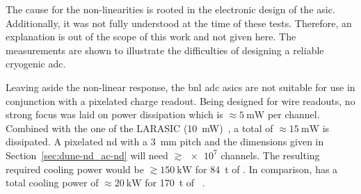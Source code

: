 The cause for the non-linearities is rooted in the electronic design of the \gls{asic}.
Additionally, it was not fully understood at the time of these tests.
Therefore, an explanation is out of the scope of this work and not given here.
The measurements are shown to illustrate the difficulties of designing a reliable cryogenic \gls{adc}.

Leaving aside the non-linear response, the \gls{bnl} \gls{adc} \glspl{asic} are not suitable for use in conjunction with a pixelated \lartpc{} charge readout.
Being designed for wire readouts, no strong focus was laid on power dissipation which is $\approx \SI{5}{\milli\watt}$ per channel.
Combined with the one of the LARASIC (\SI{10}{\milli\watt})~\cite{larasic}, a total of $\approx \SI{15}{\milli\watt}$ is dissipated.
A pixelated \dune{} \gls{nd} with a \SI{3}{\milli\metre} pitch and the dimensions given in Section~\ref{sec:dune-nd_ac-nd} will need $\gtrsim {\num{e7}}$ channels.
The resulting required cooling power would be $\gtrsim \SI{150}{\kilo\watt}$ for \SI{84}{\tonne} of \lar{}.
In comparison, \uboone{} has a total cooling power of $\approx \SI{20}{\kilo\watt}$ for \SI{170}{\tonne} of \lar{}~\cite{uboone}.

